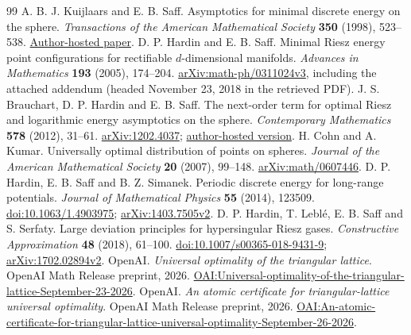 \documentclass[11pt]{article}
\begin{document}
\begin{thebibliography}{99}
A. B. J. Kuijlaars and E. B. Saff.
Asymptotics for minimal discrete energy on the sphere.
\emph{Transactions of the American Mathematical Society} \textbf{350} (1998),
523--538. \href{https://www.math.vanderbilt.edu/saffeb/texts/159.pdf}{Author-hosted paper}.
D. P. Hardin and E. B. Saff.
Minimal Riesz energy point configurations for rectifiable $d$-dimensional
manifolds. \emph{Advances in Mathematics} \textbf{193} (2005), 174--204.
\href{https://arxiv.org/abs/math-ph/0311024}{arXiv:math-ph/0311024v3},
including the attached addendum (headed November 23, 2018 in the retrieved PDF).
J. S. Brauchart, D. P. Hardin and E. B. Saff.
The next-order term for optimal Riesz and logarithmic energy asymptotics
on the sphere. \emph{Contemporary Mathematics} \textbf{578} (2012), 31--61.
\href{https://arxiv.org/abs/1202.4037}{arXiv:1202.4037};
\href{https://www.math.vanderbilt.edu/saffeb/texts/235.pdf}{author-hosted version}.
H. Cohn and A. Kumar.
Universally optimal distribution of points on spheres.
\emph{Journal of the American Mathematical Society} \textbf{20} (2007), 99--148.
\href{https://arxiv.org/abs/math/0607446}{arXiv:math/0607446}.
D. P. Hardin, E. B. Saff and B. Z. Simanek.
Periodic discrete energy for long-range potentials.
\emph{Journal of Mathematical Physics} \textbf{55} (2014), 123509.
\href{https://doi.org/10.1063/1.4903975}{doi:10.1063/1.4903975};
\href{https://arxiv.org/abs/1403.7505v2}{arXiv:1403.7505v2}.
D. P. Hardin, T. Lebl\'e, E. B. Saff and S. Serfaty.
Large deviation principles for hypersingular Riesz gases.
\emph{Constructive Approximation} \textbf{48} (2018), 61--100.
\href{https://doi.org/10.1007/s00365-018-9431-9}{doi:10.1007/s00365-018-9431-9};
\href{https://arxiv.org/abs/1702.02894v2}{arXiv:1702.02894v2}.
OpenAI. \emph{Universal optimality of the triangular lattice}.
OpenAI Math Release preprint, 2026.
\href{https://github.com/openai/math/blob/adc7f1241b42e322a6451854ab7e4b4c146bf78a/preprints/Universal-optimality-of-the-triangular-lattice-September-23-2026/paper.pdf}{OAI:Universal-optimality-of-the-triangular-lattice-September-23-2026}.
OpenAI. \emph{An atomic certificate for triangular-lattice universal optimality}.
OpenAI Math Release preprint, 2026.
\href{https://github.com/openai/math/blob/adc7f1241b42e322a6451854ab7e4b4c146bf78a/preprints/An-atomic-certificate-for-triangular-lattice-universal-optimality-September-26-2026/paper.pdf}{OAI:An-atomic-certificate-for-triangular-lattice-universal-optimality-September-26-2026}.
\end{thebibliography}
\end{document}
